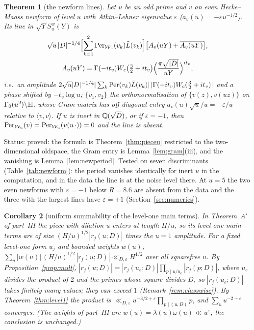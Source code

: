 \documentclass[11pt,a4paper]{article}
\newtheorem{theorem}{Theorem}
\newtheorem{corollary}[theorem]{Corollary}
\theoremstyle{remark}\newtheorem{remark}[theorem]{Remark}
\newcommand{\status}[1]{\textcolor{blue!50!black}{\small\sffamily Status: #1}}
\begin{document}
\begin{theorem}[the newform lines]\label{thm:newform}
Let $u$ be an odd prime and $v$ an even Hecke--Maass newform of level $u$ with Atkin--Lehner eigenvalue $\varepsilon$
($a_v(u)=-\varepsilon u^{-1/2}$). Its line in $\sqrt YS^w_u(Y)$ is
\[
\begin{gathered}
\sqrt u\,|D|^{-1/4}\Bigl[\sum_{k=1}^2\mathrm{Per}_{\mathcal W_u}(v_k)\tilde L(v_k)\Bigr]\bigl[A_v(uY)+\overline{A_v(uY)}\bigr],\\
A_v(uY)=\Gamma(-it_v)W_c\bigl(\tfrac32+it_v\bigr)\Bigl(\frac{\pi\sqrt{|D|}}{uY}\Bigr)^{it_v},
\end{gathered}
\]
i.e.\ an amplitude $2\sqrt u|D|^{-1/4}|\sum_k\mathrm{Per}(v_k)\tilde L(v_k)|\,|\Gamma(-it_v)W_c(\tfrac32+it_v)|$ and a phase shifted by $-t_v\log u$;
$\{v_1,v_2\}$ the orthonormalisation of $\{v(z),v(uz)\}$ on $\Gamma_0(u^2)\backslash\mathbb H$, whose Gram matrix has off-diagonal
entry $a_v(u)\sqrt u/u=-\varepsilon/u$ relative to $\langle v,v\rangle$. If $u$ is inert in $\mathbb Q(\sqrt D)$, or if $\varepsilon=-1$, then
$\mathrm{Per}_{\mathcal W_u}(v)=\mathrm{Per}_{\mathcal W_u}(v(u\,\cdot))=0$ and the line is absent.
\end{theorem}
\status{proved: the formula is Theorem~\ref{thm:pieceu} restricted to the two-dimensional oldspace, the Gram entry is
Lemma~\ref{lem:gram}(iii), and the vanishing is Lemma~\ref{lem:newperiod}. Tested on seven discriminants (Table~\ref{tab:newform}):
the period vanishes identically for inert $u$ in the computation, and in the data the line is at the noise level there. At $u=5$
the two even newforms with $\varepsilon=-1$ below $R=8.6$ are absent from the data and the three with the largest lines have
$\varepsilon=+1$ (Section~\ref{sec:numerics}).}

\begin{corollary}[uniform summability of the level-one main terms]\label{cor:sum}
In Theorem~A$'$ of part~III the piece with dilation $u$ enters at length $H/u$, so its level-one main terms are of size
$(H/u)^{1/2}|r_j(u;D)|$ times the $u=1$ amplitude. For a fixed level-one form $u_j$ and bounded weights $w(u)$,
$\sum_{u}|w(u)|\,(H/u)^{1/2}\,|r_j(u;D)|\ll_{D,\varepsilon} H^{1/2}$ over all squarefree $u$. By
Proposition~\ref{prop:mult}, $|r_j(u;D)|=|r_j(u_e;D)|\prod_{p\mid u/u_e}|r_j(p;D)|$, where $u_e$ divides the product of $2$ and the primes
whose square divides $D$, so $|r_j(u_e;D)|$ takes finitely many values; they can exceed $1$ (Remark~\ref{rem:classwise}). By
Theorem~\ref{thm:level1} the product is $\ll_{D,\varepsilon}u^{-3/2+\varepsilon}\prod_{p\mid(u,D)}p$, and $\sum_uu^{-2+\varepsilon}$ converges. (The weights of part~III are
$w(u)=\lambda(u)\omega(u)\ll u^{\varepsilon}$; the conclusion is unchanged.)
\end{corollary}
\end{document}
